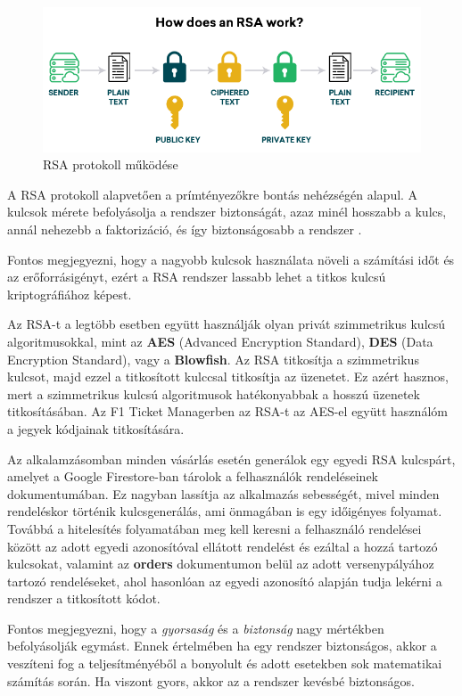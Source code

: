 \begin{figure}[!h]
	\centering
	\includegraphics[scale=0.4]{images/rsa}
	\caption{RSA protokoll működése}
	\label{abra:rsa}
\end{figure}

A RSA protokoll alapvetően a prímtényezőkre bontás nehézségén alapul. A kulcsok mérete befolyásolja a rendszer biztonságát, azaz minél hosszabb a kulcs, annál nehezebb a faktorizáció, és így biztonságosabb a rendszer \cite{SZTE}.

Fontos megjegyezni, hogy a nagyobb kulcsok használata növeli a számítási időt és az erőforrásigényt, ezért a RSA rendszer lassabb lehet a titkos kulcsú kriptográfiához képest.

Az RSA-t a legtöbb esetben együtt használják olyan privát szimmetrikus kulcsú algoritmusokkal, mint az \textbf{AES} (Advanced Encryption Standard), \textbf{DES} (Data Encryption Standard), vagy a \textbf{Blowfish}. Az RSA titkosítja a szimmetrikus kulcsot, majd ezzel a titkosított kulccsal titkosítja az üzenetet. Ez azért hasznos, mert a szimmetrikus kulcsú algoritmusok hatékonyabbak a hosszú üzenetek titkosításában. Az F1 Ticket Managerben az RSA-t az AES-el együtt használóm a jegyek kódjainak titkosítására.

Az alkalamzásomban minden vásárlás esetén generálok egy egyedi RSA kulcspárt, amelyet a Google Firestore-ban tárolok a felhasználók rendeléseinek dokumentumában. Ez nagyban lassítja az alkalmazás sebességét, mivel minden rendeléskor történik kulcsgenerálás, ami önmagában is egy időigényes folyamat. Továbbá a hitelesítés folyamatában meg kell keresni a felhasználó rendelései között az adott egyedi azonosítóval ellátott rendelést és ezáltal a hozzá tartozó kulcsokat, valamint az \textbf{orders} dokumentumon belül az adott versenypályához tartozó rendeléseket, ahol hasonlóan az egyedi azonosító alapján tudja lekérni a rendszer a titkosított kódot.

Fontos megjegyezni, hogy a \textit{gyorsaság} és a \textit{biztonság} nagy mértékben befolyásolják egymást. Ennek értelmében ha egy rendszer biztonságos, akkor a veszíteni fog a teljesítményéből a bonyolult és adott esetekben sok matematikai számítás során. Ha viszont gyors, akkor az a rendszer kevésbé biztonságos.

